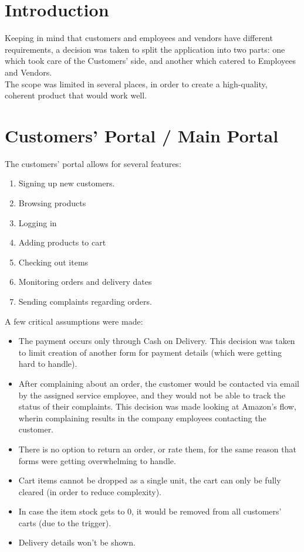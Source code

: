 \documentclass[12pt]{report}
\begin{document}
    \section*{Introduction}
    Keeping in mind that customers and employees and vendors have different requirements, a decision was taken to split the application into two parts: one which took care of the Customers' side, and another which catered to Employees and Vendors.
    \\
    The scope was limited in several places, in order to create a high-quality, coherent product that would work well.
    \\
    \section{Customers' Portal / Main Portal}
    The customers' portal allows for several features:
    
        \begin{enumerate}
            \item Signing up new customers.
            \item Browsing products
            \item Logging in
            \item Adding products to cart
            \item Checking out items
            \item Monitoring orders and delivery dates
            \item Sending complaints regarding orders.
        \end{enumerate}
    A few critical assumptions were made:
    \\
        \begin{itemize}
            \item The payment occurs only through Cash on Delivery. This decision was taken to limit creation of another form for payment details (which were getting hard to handle).
            \item After complaining about an order, the customer would be contacted via email by the assigned service employee, and they would not be able to track the status of their complaints. This decision was made looking at Amazon's flow, wherin complaining results in the company employees contacting the customer.
            \item There is no option to return an order, or rate them, for the same reason that forms were getting overwhelming to handle.
            \item Cart items cannot be dropped as a single unit, the cart can only be fully cleared (in order to reduce complexity).
            \item In case the item stock gets to 0, it would be removed from all customers' carts (due to the trigger).
            \item Delivery details won't be shown.
        \end{itemize}
    
\end{document}
